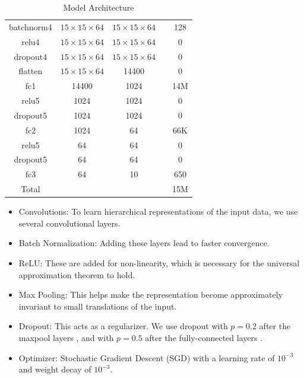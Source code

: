 \documentclass{article}
\begin{document}
\begin{sloppypar}
\begin{center}
\begin{table}[!h]
\begin{tabular}{|c|c|c|c|c|}
                    batchnorm4 & $15\times 15\times 64$ & $15\times 15\times 64$ & & 128\\
                    relu4 & $15\times 15\times 64$ & $15\times 15\times 64$ & & 0\\
                    dropout4 & $15\times 15\times 64$ & $15\times 15\times 64$ & & 0\\
                    \hline
                    flatten & $15\times 15\times 64$ & 14400 & & 0\\
                    \hline
                    fc1 & 14400 & 1024 & & 14M\\
                    relu5 & 1024 & 1024 & & 0\\
                    dropout5 & 1024 & 1024 & & 0\\
                    \hline
                    fc2 & 1024 & 64 & & 66K\\
                    relu5 & 64 & 64 & & 0\\
                    dropout5 & 64 & 64 & & 0\\
                    \hline
                    fc3 & 64 & 10 & & 650\\
                    \hline \hline
                    Total & & & & 15M\\
                    \hline
                \end{tabular}
                \caption{\label{table-1}Model Architecture}
            \end{table}
        \end{center}

        \begin{itemize}
            \item Convolutions: To learn hierarchical representations of the input data, we use several convolutional layers.
            \item Batch Normalization: Adding these layers lead to faster convergence.
            \item ReLU: These are added for non-linearity, which is necessary for the universal approximation theorem to hold.
            \item Max Pooling: This helps make the representation become approximately invariant to small translations of the input.
            \item Dropout: This acts as a regularizer. We use dropout with $p=0.2$ after the maxpool layers \cite{dropout_analysis}, and with $p=0.5$ after the fully-connected layers \cite{dropout_hinton}.
            \item Optimizer: Stochastic Gradient Descent (SGD) with a learning rate of $10^{-3}$ and weight decay of $10^{-3}$.
        \end{itemize}


\end{sloppypar}
\end{document}
